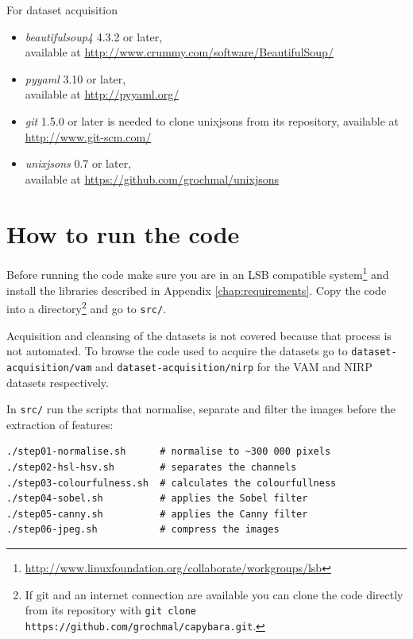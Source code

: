 \documentclass[11pt,a4paper,draft]{report}
\begin{document}
For dataset acquisition
\begin{itemize}
\item[]\emph{beautifulsoup4} 4.3.2 or later, \\
available at \href{http://www.crummy.com/software/BeautifulSoup/}
{http://www.crummy.com/software/BeautifulSoup/}

\item[]\emph{pyyaml} 3.10 or later, \\
available at \href{http://pyyaml.org/}{http://pyyaml.org/}

\item[]\emph{git} 1.5.0 or later is needed to clone unixjsons from its
repository, available at \href{http://www.git-scm.com/}{http://www.git-scm.com/}

\item[]\emph{unixjsons} 0.7 or later, \\
available at \href{https://github.com/grochmal/unixjsons}
{https://github.com/grochmal/unixjsons}
\end{itemize}

\chapter{How to run the code}
\label{chap:runthecode}

Before running the code make sure you are in an LSB compatible system\footnote{
\href{http://www.linuxfoundation.org/collaborate/workgroups/lsb}
{http://www.linuxfoundation.org/collaborate/workgroups/lsb}} and install the
libraries described in Appendix \ref{chap:requirements}.  Copy the code into a
directory\footnote{If git and an internet connection are available you can
clone the code directly from its repository with
\verb|git clone https://github.com/grochmal/capybara.git|.}
and go to \texttt{src/}.

Acquisition and cleansing of the datasets is not covered because that process
is not automated.  To browse the code used to acquire the datasets go to
\texttt{dataset-acquisition/vam} and \texttt{dataset-acquisition/nirp} for the
VAM and NIRP datasets respectively.

In \texttt{src/} run the scripts that normalise, separate and filter the images
before the extraction of features:

\begin{Verbatim}[frame=leftline]
./step01-normalise.sh      # normalise to ~300 000 pixels
./step02-hsl-hsv.sh        # separates the channels
./step03-colourfulness.sh  # calculates the colourfullness
./step04-sobel.sh          # applies the Sobel filter
./step05-canny.sh          # applies the Canny filter
./step06-jpeg.sh           # compress the images
\end{Verbatim}
\end{document}
